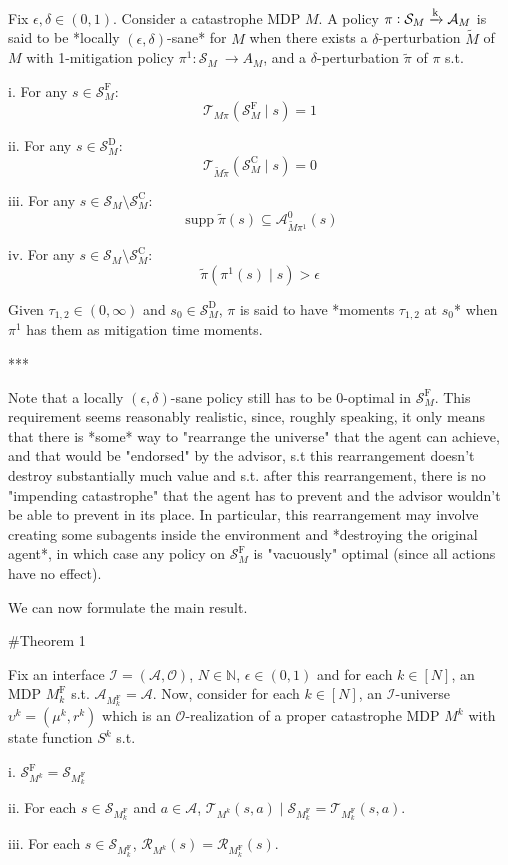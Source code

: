 \documentclass[a4paper]{article}
\DeclareMathOperator{\Supp}{supp}
\newcommand{\AP}[1]{\left(#1\right)}
\newcommand{\Nats}{\mathbb{N}}
\newcommand{\M}{\xrightarrow{\textnormal{k}}}
\newcommand{\Ob}{\mathcal{O}}
\newcommand{\A}{\mathcal{A}}
\newcommand{\St}{\mathcal{S}}
\newcommand{\T}{\mathcal{T}}
\newcommand{\R}{\mathcal{R}}
\newcommand{\In}{\mathcal{I}}
\newcommand{\SF}{\St^{\text{F}}}
\newcommand{\SD}{\St^{\text{D}}}
\newcommand{\SC}{\St^{\text{C}}}
\newcommand{\MF}{M^{\text{F}}}
\begin{document}
Fix $\epsilon,\delta \in (0,1)$. Consider a catastrophe MDP $M$. A policy $\pi: \St_M \M \A_M$ is said to be *locally $(\epsilon,\delta)$-sane* for $M$ when there exists a $\delta$-perturbation $\tilde{M}$ of $M$ with 1-mitigation policy $\pi^1: \St_M\ \rightarrow A_M$, and a $\delta$-perturbation $\tilde{\pi}$ of $\pi$ s.t.

i. For any $s \in \SF_M$: $$\T_{M\pi}\AP{\SF_M \mid s} = 1$$

ii. For any $s \in \SD_M$: $$\T_{\tilde{M}\tilde{\pi}}\AP{\SC_M \mid s} = 0$$

iii. For any $s \in \St_M \setminus \SC_M$: $$\Supp{\tilde{\pi}(s)} \subseteq \A_{\tilde{M}\pi^1}^0(s)$$

iv. For any $s \in \St_M \setminus \SC_M$: $$\tilde{\pi}\AP{\pi^1(s) \mid s} > \epsilon$$

Given $\tau_{1,2} \in (0,\infty)$ and $s_0 \in \SD_M$, $\pi$ is said to have *moments $\tau_{1,2}$ at $s_0$* when $\pi^1$ has them as mitigation time moments.

***

Note that a locally $(\epsilon,\delta)$-sane policy still has to be $0$-optimal in $\SF_M$. This requirement seems reasonably realistic, since, roughly speaking, it only means that there is *some* way to "rearrange the universe" that the agent can achieve, and that would be "endorsed" by the advisor, s.t this rearrangement doesn't destroy substantially much value and s.t. after this rearrangement, there is no "impending catastrophe" that the agent has to prevent and the advisor wouldn't be able to prevent in its place. In particular, this rearrangement may involve creating some subagents inside the environment and *destroying the original agent*, in which case any policy on $\SF_M$ is "vacuously" optimal (since all actions have no effect).

We can now formulate the main result.

\#Theorem 1

Fix an interface $\In=(\A,\Ob)$, $N \in \Nats$, $\epsilon \in (0,1)$ and for each $k \in [N]$, an MDP $\MF_k$ s.t. $\A_{\MF_k} = \A$. Now, consider for each $k \in [N]$, an $\In$-universe $\upsilon^k=(\mu^k,r^k)$ which is an $\Ob$-realization of a proper catastrophe MDP $M^k$ with state function $S^k$ s.t.

i. $\SF_{M^k} = \St_{\MF_k}$

ii. For each $s \in \St_{\MF_k}$ and $a \in \A$, $\T_{M^k}(s,a) \mid \St_{\MF_k} = \T_{\MF_k}(s,a)$.

iii. For each $s \in \St_{\MF_k}$, $\R_{M^k}(s)=\R_{\MF_k}(s)$.
\end{document}
